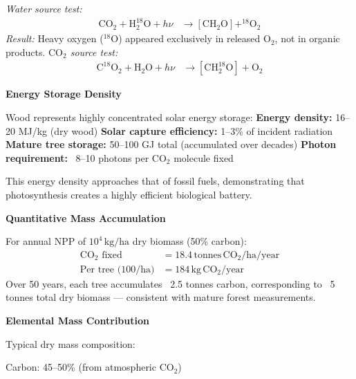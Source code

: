 \begin{technical}
\noindent\textit{Water source test:}
\begin{align}
\mathrm{CO}_2 + \mathrm{H}_2^{18}\mathrm{O} + h\nu 
&\rightarrow [\mathrm{CH}_2\mathrm{O}] + ^{18}\mathrm{O}_2
\end{align}
\textit{Result:} Heavy oxygen ($^{18}\mathrm{O}$) appeared exclusively in released $\mathrm{O}_2$, not in organic products.
\noindent\textit{$\mathrm{CO}_2$ source test:}
\begin{align}
\mathrm{C}^{18}\mathrm{O}_2 + \mathrm{H}_2\mathrm{O} + h\nu 
&\rightarrow [\mathrm{CH}_2^{18}\mathrm{O}] + \mathrm{O}_2
\end{align}

\vspace{0.5em}
\noindent\textbf{Energy Storage Density}

\vspace{0.2em}
\noindent Wood represents highly concentrated solar energy storage: \noindent\textbf{Energy density:} 16–20 MJ/kg (dry wood) \noindent\textbf{Solar capture efficiency:} 1–3\% of incident radiation \noindent\textbf{Mature tree storage:} 50–100 GJ total (accumulated over decades) \noindent\textbf{Photon requirement:} ~8–10 photons per $\mathrm{CO}_2$ molecule fixed

\vspace{0.3em}
\noindent This energy density approaches that of fossil fuels, demonstrating that photosynthesis creates a highly efficient biological battery.

\vspace{0.5em}
\noindent\textbf{Quantitative Mass Accumulation}

\vspace{0.2em}
\noindent For annual NPP of $10^4\,\mathrm{kg/ha}$ dry biomass (50\% carbon):
\begin{align}
\text{$\mathrm{CO}_2$ fixed} &= 18.4\,\mathrm{tonnes}\,\mathrm{CO}_2/\mathrm{ha}/\mathrm{year} \\
\text{Per tree (100/ha)} &= 184\,\mathrm{kg}\,\mathrm{CO}_2/\mathrm{year}
\end{align}
Over 50 years, each tree accumulates ~2.5 tonnes carbon, corresponding to ~5 tonnes total dry biomass — consistent with mature forest measurements.

\vspace{0.5em}
\noindent\textbf{Elemental Mass Contribution}

\vspace{0.2em}
\noindent Typical dry mass composition:

\noindent Carbon: 45–50\% (from atmospheric $\mathrm{CO}_2$)


\end{technical}
